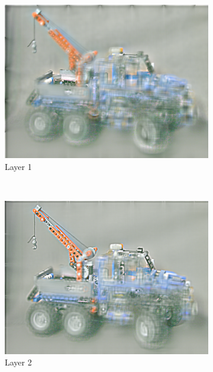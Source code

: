 \documentclass[11pt,a4paper,titlepage]{article}
\begin{document}
\begin{figure}
	\centering
	\begin{subfigure}[t]{0.31\textwidth}
		\includegraphics[width=\textwidth]{results/tiles_legotruck_6x6x480x640_480x640x5_tiling_4x6x200x200_overlap_0.5/1.png}
		\caption{Layer 1}
	\end{subfigure}%
	~
	\begin{subfigure}[t]{0.31\textwidth}
		\includegraphics[width=\textwidth]{results/tiles_legotruck_6x6x480x640_480x640x5_tiling_4x6x200x200_overlap_0.5/2.png}
		\caption{Layer 2}
	\end{subfigure}%
	~
	\begin{subfigure}[t]{0.31\textwidth}

\end{subfigure}
\end{figure}
\end{document}
